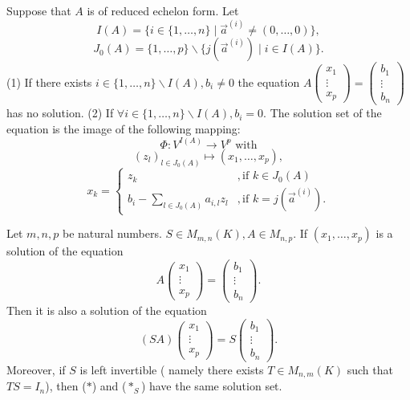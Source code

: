 \documentclass{book}
\numberwithin{equation}{section}
\begin{document}
\begin{theoremenv}
    Suppose that $A$ is of reduced echelon form. Let 
    $$I(A)=\{i\in \{1,\dots,n\}\mid \vec{a}^{(i)}\not=(0,\dots,0)\},$$
    $$J_0(A)=\{1,\dots,p\}\backslash\{j\left(\vec{a}^{(i)}\right)\mid i\in I(A)\}.$$
    (1) If there exists $i\in \{1,\dots,n\}\backslash I(A),b_i\not=0$ the equation $A\begin{pmatrix}
 x_1\\
 \vdots\\
x_p
\end{pmatrix}=
\begin{pmatrix}
 b_1\\
 \vdots\\
b_n
\end{pmatrix}$ has no solution.
\newline
(2) If $\forall i\in\{1,\dots ,n\}\backslash I(A),b_i=0$. The solution set of the equation is the image of the following mapping:
$$\Phi:V^{I(A)}\longrightarrow V^p \text{ with}$$
$$(z_l)_{l\in J_0(A)}\longmapsto (x_1,\dots,x_p),$$
$$x_k=\left\{ \begin{matrix}
    z_k &,\text{if } k\in J_0(A)\\
    b_i-\sum_{l\in J_0(A)}a_{i,l}z_l &,\text{if } k=j\left(\vec{a}^{(i)}\right) .
\end{matrix}\right.$$

\end{theoremenv}
\begin{propositionenv}
    Let $m,n,p$ be natural numbers. $S\in M_{m,n}(K), A\in M_{n,p}$. If $(x_1,\dots,x_p)$ is a solution of the equation
    \begin{equation*}
        A\begin{pmatrix}
        x_1\\
        \vdots\\
        x_p
        \end{pmatrix}=\begin{pmatrix}
        b_1\\
        \vdots\\
        b_n
        \end{pmatrix}.\tag{$*$}
    \end{equation*}
    Then it is also a solution of the equation
    \begin{equation*}(SA)\begin{pmatrix}
        x_1\\
        \vdots\\
        x_p
        \end{pmatrix}=S\begin{pmatrix}
        b_1\\
        \vdots\\
        b_n
        \end{pmatrix}.\tag{$*_S$}
        \end{equation*}
    Moreover, if $S$ is left invertible ( namely there exists $T\in M_{n,m}(K)$ such that $TS=I_n$), then ($*$) and ($*_S$) have the same solution set.
\end{propositionenv}
\end{document}
